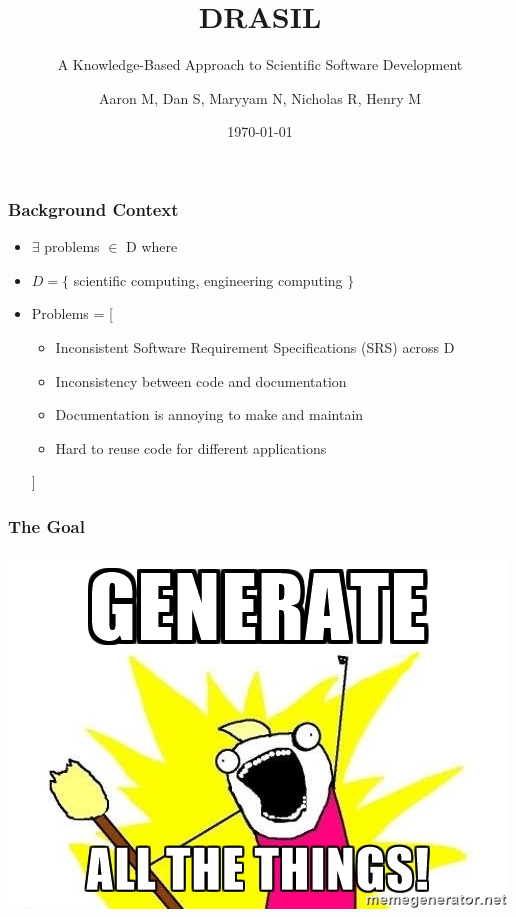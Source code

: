 \documentclass{beamer}
\title{DRASIL}
\subtitle{A Knowledge-Based Approach to Scientific Software Development}
\author{Aaron M, Dan S, Maryyam N, Nicholas R, Henry M}
\institute{McMaster University}
\date{\today}
\begin{document}
\frame{\titlepage}

\begin{frame}
\frametitle{Background Context}
\begin{itemize}
 \item $\exists$ problems $\in$ D where
 \item $D = \{$ scientific computing, engineering computing $\}$
 \item Problems = [\\ 
  \begin{itemize}
   \item Inconsistent Software Requirement Specifications (SRS) across D
   \item Inconsistency between code and documentation
   \item Documentation is annoying to make and maintain
   \item Hard to reuse code for different applications
  \end{itemize}
 ]
\end{itemize}
\end{frame}

\begin{frame}
\frametitle{The Goal}
\includegraphics[scale=0.70]{../WG2_11/generate_all_the_things.jpg}
\end{frame}
\end{document}

